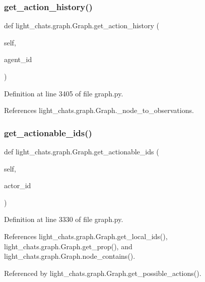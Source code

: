 \subsubsection{\texorpdfstring{get\+\_\+action\+\_\+history()}{get\_action\_history()}}
{\footnotesize\ttfamily def light\+\_\+chats.\+graph.\+Graph.\+get\+\_\+action\+\_\+history (\begin{DoxyParamCaption}\item[{}]{self,  }\item[{}]{agent\+\_\+id }\end{DoxyParamCaption})}



Definition at line 3405 of file graph.\+py.



References light\+\_\+chats.\+graph.\+Graph.\+\_\+node\+\_\+to\+\_\+observations.

\mbox{\label{classlight__chats_1_1graph_1_1Graph_a04cea64dfded92bfd69055e184aa390d}} 
\subsubsection{\texorpdfstring{get\+\_\+actionable\+\_\+ids()}{get\_actionable\_ids()}}
{\footnotesize\ttfamily def light\+\_\+chats.\+graph.\+Graph.\+get\+\_\+actionable\+\_\+ids (\begin{DoxyParamCaption}\item[{}]{self,  }\item[{}]{actor\+\_\+id }\end{DoxyParamCaption})}



Definition at line 3330 of file graph.\+py.



References light\+\_\+chats.\+graph.\+Graph.\+get\+\_\+local\+\_\+ids(), light\+\_\+chats.\+graph.\+Graph.\+get\+\_\+prop(), and light\+\_\+chats.\+graph.\+Graph.\+node\+\_\+contains().



Referenced by light\+\_\+chats.\+graph.\+Graph.\+get\+\_\+possible\+\_\+actions().

